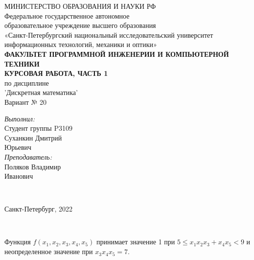 \documentclass{article}
\begin{document}
{\centering
МИНИСТЕРСТВО ОБРАЗОВАНИЯ И НАУКИ РФ \\
\vspace{0.6cm}
Федеральное государственное автономное \\
образовательное учреждение высшего образования \\
«Санкт-Петербургский национальный исследовательский университет \\
 информационных технологий, механики и оптики» \\
\vspace{0.6cm}
\footnotesize{\textbf{ФАКУЛЬТЕТ ПРОГРАММНОЙ ИНЖЕНЕРИИ И КОМПЬЮТЕРНОЙ ТЕХНИКИ}} \\
\vspace{3.2cm}
\Large{\textbf{КУРСОВАЯ РАБОТА, ЧАСТЬ 1}} \\
\large{по дисциплине} \\
\Large{'Дискретная математика'} \\
\vspace{1cm}
\Large{Вариант № 20} \\
\vspace{9cm}
\begin{minipage}{\linewidth}
\raggedleft
\normalsize
\textsl{Выполнил:} \\
Студент группы P3109 \\
Суханкин Дмитрий \\ Юрьевич \\
\textsl{Преподаватель:} \\
Поляков Владимир \\ Иванович
\end{minipage} \\
\vspace{2cm}
\begin{minipage}{\linewidth}
\centering
\normalsize{Санкт-Петербург, 2022} \\
\end{minipage} \\}

\thispagestyle{empty}
\newpage

Функция $f(x_1, x_2, x_3, x_4, x_5)$ принимает значение 1 при $5 \le x_1 x_2 x_3 + x_4 x_5 < 9$ и неопределенное значение при $x_3 x_4 x_5 = 7$.
\end{document}
